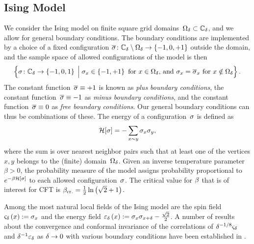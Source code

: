 \documentclass[12pt,oneside,english]{amsart}
\numberwithin{equation}{section}
\numberwithin{figure}{section}
\theoremstyle{plain}
\theoremstyle{plain}
\theoremstyle{plain}
\theoremstyle{plain}
\theoremstyle{remark}
\theoremstyle{definition}
\theoremstyle{plain}
\theoremstyle{plain}
\numberwithin{thm}{section}
\newcommand{\kallemod}[1]{{\color{kallecol} {#1}}}
\begin{document}
\subsection{\label{subsec:ising-model}Ising Model }

We consider the Ising model on finite square grid 
domains~${{\Omega}}_{{\delta}}\subset{\mathbb{C}_{{\delta}}}$, and we allow for general boundary 
conditions. The boundary conditions are implemented by a choice of a fixed
configuration 
$\overline{{\sigma}} \colon {\mathbb{C}_{{\delta}}} \setminus {{\Omega}}_{{\delta}} \to \left\{ -1,0,+1 \right\}$
outside the domain, and the sample space of allowed 
configurations of the model is then
\begin{align*}
\left\{  {\sigma} \colon {\mathbb{C}_{{\delta}}} \to \left\{ -1,0,1 \right\} \; \Big| \;
 {\sigma}_x \in \left\{ -1,+1 \right\} \text{ for $x \in {{\Omega}}_{{\delta}}$, and }
 {\sigma}_x = \overline{{\sigma}}_x \text{ for $x \notin {{\Omega}}_{{\delta}}$}
  \right\} .
\end{align*}
The constant function~$\overline{{\sigma}} \equiv +1$ is known as
\emph{plus boundary conditions}, the constant function~$\overline{{\sigma}} 
\equiv -1$ as \emph{minus boundary conditions}, and the constant 
function~$\overline{{\sigma}} \equiv 0$ as \emph{free boundary conditions}. Our 
general boundary conditions can thus be combinations of these.
The energy of a configuration~${\sigma}$ is defined as
\begin{align*}
\mathcal{H}[{\sigma}] = - \sum_{x\sim y}{\sigma}_{x}{\sigma}_{y} ,
\end{align*}
where the sum is over nearest neighbor pairs such that at least one of the 
vertices $x,y$ belongs to the (finite) domain~${{\Omega}}_{{\delta}}$. Given an inverse 
temperature parameter~$\beta>0$, the probability measure of the model assigns
probability proportional
to~$e^{-{{\beta}} \mathcal{H}[{\sigma}] }$ to each allowed configuration~${\sigma}$.
The critical value for ${{\beta}}$ that is
of interest for CFT is ${{\beta}}_{\mathrm{cr.}}=\frac{1}{2}\ln\left(\sqrt{2}+1\right)$.

Among the most natural local fields of the Ising model are the spin field 
${\varsigma}_{{\delta}}\left(x\right):={\sigma}_{x}$
and the energy field
${\varepsilon}_{{\delta}}\left(x\right)
:= {\sigma}_{x}{\sigma}_{x+{\delta}}-\frac{\sqrt{2}}{2}$.
A number of results about the convergence and conformal invariance
of the correlations of ${\delta}^{-1/8} {\varsigma}_{{\delta}}$ and 
${\delta}^{-1} {\varepsilon}_{{\delta}}$
as ${\delta} \to 0$ with various boundary conditions have been established in
\cite{chelkak-hongler-izyurov, hongler,
hongler-smirnov, chelkak-hongler-izyurov-ii}.
\end{document}
